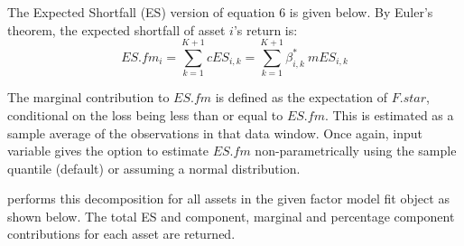 \documentclass[a4paper]{article}\usepackage[]{graphicx}\usepackage[]{color}
\begin{document}
The Expected Shortfall (ES) version of equation 6 is given below. By Euler's theorem, the expected shortfall of asset $i$'s return is:
\begin{equation}
ES.fm_i = \sum_{k=1}^{K+1} cES_{i,k} = \sum_{k=1}^{K+1} \beta^*_{i,k} \: mES_{i,k}
\end{equation}

The marginal contribution to $ES.fm$ is defined as the expectation of $F.star$, conditional on the loss being less than or equal to $ES.fm$. This is estimated as a sample average of the observations in that data window. Once again, input variable  gives the option to estimate $ES.fm$ non-parametrically using the sample quantile (default) or assuming a normal distribution.

 performs this decomposition for all assets in the given factor model fit object as shown below. The total ES and component, marginal and percentage component contributions for each asset are returned.
\end{document}
